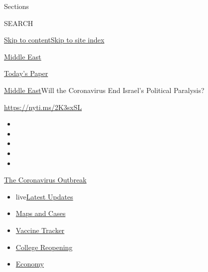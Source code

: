 Sections

SEARCH

\protect\hyperlink{site-content}{Skip to
content}\protect\hyperlink{site-index}{Skip to site index}

\href{https://www.nytimes.com/section/world/middleeast}{Middle East}

\href{https://myaccount.nytimes.com/auth/login?response_type=cookie\&client_id=vi}{}

\href{https://www.nytimes.com/section/todayspaper}{Today's Paper}

\href{/section/world/middleeast}{Middle East}\textbar{}Will the
Coronavirus End Israel's Political Paralysis?

\url{https://nyti.ms/2K3sxSL}

\begin{itemize}
\item
\item
\item
\item
\item
\end{itemize}

\href{https://www.nytimes.com/news-event/coronavirus?action=click\&pgtype=Article\&state=default\&region=TOP_BANNER\&context=storylines_menu}{The
Coronavirus Outbreak}

\begin{itemize}
\tightlist
\item
  live\href{https://www.nytimes.com/2020/08/04/world/coronavirus-covid-19.html?action=click\&pgtype=Article\&state=default\&region=TOP_BANNER\&context=storylines_menu}{Latest
  Updates}
\item
  \href{https://www.nytimes.com/interactive/2020/us/coronavirus-us-cases.html?action=click\&pgtype=Article\&state=default\&region=TOP_BANNER\&context=storylines_menu}{Maps
  and Cases}
\item
  \href{https://www.nytimes.com/interactive/2020/science/coronavirus-vaccine-tracker.html?action=click\&pgtype=Article\&state=default\&region=TOP_BANNER\&context=storylines_menu}{Vaccine
  Tracker}
\item
  \href{https://www.nytimes.com/2020/08/02/us/covid-college-reopening.html?action=click\&pgtype=Article\&state=default\&region=TOP_BANNER\&context=storylines_menu}{College
  Reopening}
\item
  \href{https://www.nytimes.com/live/2020/08/03/business/stock-market-today-coronavirus?action=click\&pgtype=Article\&state=default\&region=TOP_BANNER\&context=storylines_menu}{Economy}
\end{itemize}

